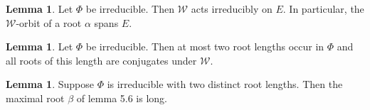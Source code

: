 \documentclass{article}
\theoremstyle{definition}
\newtheorem{lemma}[theorem]{Lemma}
\begin{document}
\begin{lemma}
    Let \(\Phi\) be irreducible. Then \(\mathcal{W}\) acts irreducibly on \(E\). In particular, the \(\mathcal{W}\)-orbit of a root \(\alpha\) spans \(E\).
\end{lemma}

\begin{lemma}
    Let \(\Phi\) be irreducible. Then at most two root lengths occur in \(\Phi\) and all roots of this length are conjugates under \(\mathcal{W}\).
\end{lemma}

\begin{lemma}
    Suppose \(\Phi\) is irreducible with two distinct root lengths. Then the maximal root \(\beta\) of lemma 5.6 is long.
\end{lemma}
\end{document}
